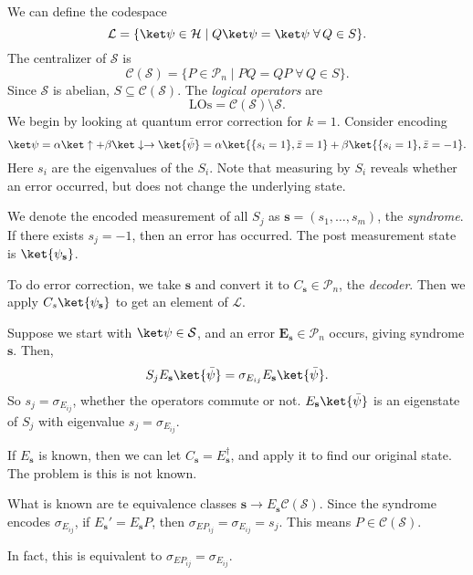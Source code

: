\documentclass[12pt]{article}
\begin{document}
We can define the codespace
\[
	\mathcal{L} = \{ \ket \psi \in \mathcal{H} \mid Q \ket \psi = \ket \psi\; \forall \, Q \in S\}.
\]
The centralizer of $\mathcal{S}$ is
\[
	\mathcal{C}(\mathcal{S}) = \{P \in \mathcal{P}_n \mid PQ = QP \; \forall \, Q \in S\}.
\]
Since $\mathcal{S}$ is abelian, $S \subseteq \mathcal{C}(\mathcal{S})$. The \emph{logical operators} are
\[
\mathrm{LOs} = \mathcal{C}(\mathcal{S}) \setminus \mathcal{S}.
\]
We begin by looking at quantum error correction for $k = 1$. Consider encoding
\[
	\ket \psi = \alpha \ket \uparrow + \beta \ket \downarrow \to \ket{\bar \psi} = \alpha \ket{\{s_i = 1\}, \bar z = 1} + \beta \ket{\{s_i = 1\}, \bar z = -1}.
\]
Here $s_i$ are the eigenvalues of the $S_i$. Note that measuring by $S_i$ reveals whether an error occurred, but does not change the underlying state.

We denote the encoded measurement of all $S_j$ as $\mathbf{s} = (s_1, \ldots, s_m)$, the \emph{syndrome}. If there exists $s_j = -1$, then an error has occurred. The post measurement state is $\ket{\psi_{\mathbf{s}}}$.

To do error correction, we take $\mathbf{s}$ and convert it to $C_{\mathbf{s}} \in \mathcal{P}_n$, the \emph{decoder}. Then we apply $C_s \ket{\psi_{\mathbf{s}}}$ to get an element of $\mathcal{L}$.

\begin{exbox}
	Suppose we start with $\ket\psi \in \mathcal{S}$, and an error $\mathbf{E}_{\mathbf{s}} \in \mathcal{P}_n$ occurs, giving syndrome $\mathbf{s}$. Then,
	\[
		S_j E_{\mathbf{s}} \ket{\bar \psi} = \sigma_{E_{ij}} E_{\mathbf{s}} \ket{\bar \psi}.
	\]
	So $s_j = \sigma_{E_{ij}}$, whether the operators commute or not. $E_{\mathbf{s}} \ket{\bar \psi}$ is an eigenstate of $S_j$ with eigenvalue $s_j = \sigma_{E_{ij}}$.
\end{exbox}

If $E_{\mathbf{s}}$ is known, then we can let $C_{\mathbf{s}} = E_{\mathbf{s}}^{\dagger}$, and apply it to find our original state. The problem is this is not known.

What is known are te equivalence classes $\mathbf{s} \to E_{\mathbf{s}} \mathcal{C}(\mathcal{S})$. Since the syndrome encodes $\sigma_{E_{ij}}$, if $E_{\mathbf{s}}' = E_{\mathbf{s}} P$, then $\sigma_{EP_{ij}} = \sigma_{E_{ij}} = s_j$. This means $P \in \mathcal{C}(\mathcal{S})$.

In fact, this is equivalent to $\sigma_{EP_{ij}} = \sigma_{E_{ij}}$.
\end{document}
